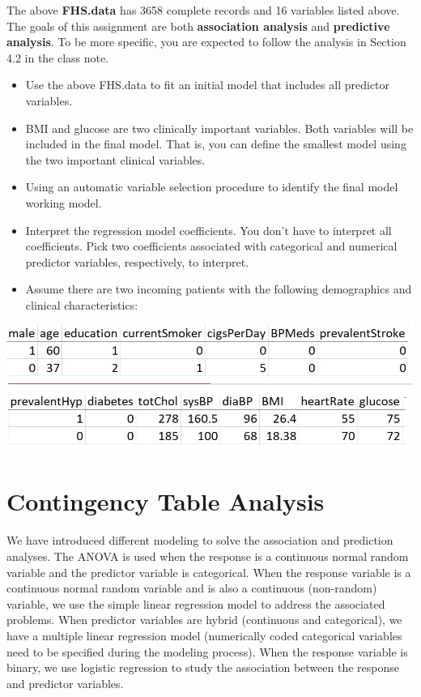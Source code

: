 \documentclass[
]{book}
\providecommand{\tightlist}{%
  \setlength{\itemsep}{0pt}\setlength{\parskip}{0pt}}
\begin{document}
The above \textbf{FHS.data} has 3658 complete records and 16 variables listed above. The goals of this assignment are both \textbf{association analysis} and \textbf{predictive analysis}. To be more specific, you are expected to follow the analysis in Section 4.2 in the class note.

\begin{itemize}
\tightlist
\item
  Use the above FHS.data to fit an initial model that includes all predictor variables.
\item
  BMI and glucose are two clinically important variables. Both variables will be included in the final model. That is, you can define the smallest model using the two important clinical variables.
\item
  Using an automatic variable selection procedure to identify the final model working model.
\item
  Interpret the regression model coefficients. You don't have to interpret all coefficients. Pick two coefficients associated with categorical and numerical predictor variables, respectively, to interpret.
\item
  Assume there are two incoming patients with the following demographics and clinical characteristics:
\end{itemize}

\begin{center}\includegraphics[width=0.9\linewidth]{img11/w11-AssignPredNewData} \end{center}

\hypertarget{contingency-table-analysis}{%
\chapter{Contingency Table Analysis}\label{contingency-table-analysis}}

We have introduced different modeling to solve the association and prediction analyses. The ANOVA is used when the response is a continuous normal random variable and the predictor variable is categorical. When the response variable is a continuous normal random variable and is also a continuous (non-random) variable, we use the simple linear regression model to address the associated problems. When predictor variables are hybrid (continuous and categorical), we have a multiple linear regression model (numerically coded categorical variables need to be specified during the modeling process). When the response variable is binary, we use logistic regression to study the association between the response and predictor variables.
\end{document}
